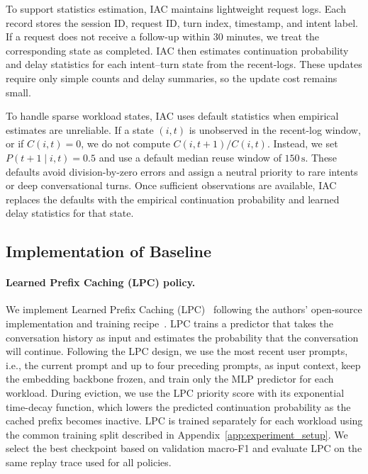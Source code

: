 \documentclass{article}
\begin{document}
To support statistics estimation, IAC maintains lightweight request logs. Each record stores the session ID, request ID, turn index, timestamp, and intent label. If a request does not receive a follow-up within 30 minutes, we treat the corresponding state as completed. IAC then estimates continuation probability and delay statistics for each intent--turn state from the recent-logs. These updates require only simple counts and delay summaries, so the update cost remains small.

To handle sparse workload states, IAC uses default statistics when empirical estimates are unreliable. If a state \((i,t)\) is unobserved in the recent-log window, or if \(C(i,t)=0\), we do not compute \(C(i,t+1)/C(i,t)\). Instead, we set \(P(t+1 \mid i,t)=0.5\) and use a default median reuse window of \(150\,\mathrm{s}\). These defaults avoid division-by-zero errors and assign a neutral priority to rare intents or deep conversational turns. Once sufficient observations are available, IAC replaces the defaults with the empirical continuation probability and learned delay statistics for that state.



\subsection{Implementation of Baseline}
\label{app:baselines}

\paragraph{Learned Prefix Caching (LPC) policy.} We implement Learned Prefix Caching (LPC)~\cite{yanglearned} following the authors' open-source implementation and training recipe~\cite{lpc_github}. LPC trains a predictor that takes the conversation history as input and estimates the probability that the conversation will continue. Following the LPC design, we use the most recent user prompts, i.e., the current prompt and up to four preceding prompts, as input context, keep the embedding backbone frozen, and train only the MLP predictor for each workload. During eviction, we use the LPC priority score with its exponential time-decay function, which lowers the predicted continuation probability as the cached prefix becomes inactive. LPC is trained separately for each workload using the common training split described in Appendix~\ref{app:experiment_setup}. We select the best checkpoint based on validation macro-F1 and evaluate LPC on the same replay trace used for all policies.
\end{document}
